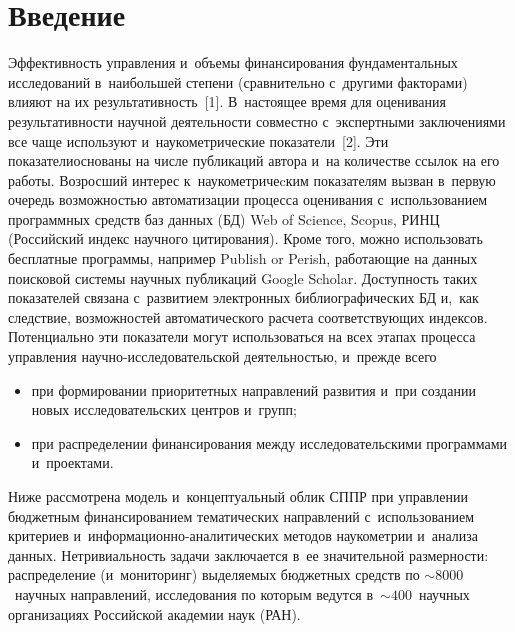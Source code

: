 \thispagestyle{headings}

\begin{multicols}{2}

\label{st\stat}
    
    \section{Введение}
    
    Эффективность управления и~объемы фи\-нансирования фундаментальных 
исследований в~наиболь\-шей степени (сравнительно с~другими факторами) 
влияют на их результативность~[1]. В~настоящее время для оценивания 
результативности научной деятельности совместно с~экс\-пертными 
заключениями все чаще используют и~наукометрические показатели~[2]. Эти 
показатели\linebreak основаны на числе публикаций автора и~на количестве ссылок на 
его работы. Возросший интерес\linebreak
 к~наукометричеcким показателям вызван 
в~первую очередь возможностью автоматизации процесса оценивания 
с~использованием программных средств баз данных (БД)  Web of Science, Scopus, 
РИНЦ (Российский индекс научного цитирования). 
Кроме того, можно использовать бесплатные программы, например 
Publish or Perish, ра\-бо\-тающие на данных поисковой системы научных\linebreak 
пуб\-ли\-ка\-ций Google Scholar. Доступность таких показателей связана 
с~развитием электронных биб\-лио\-гра\-фи\-че\-ских БД и,~как следствие, 
возможностей автоматического расчета соответствующих индексов. 
Потенциально эти показатели могут использоваться на всех этапах процесса 
управления на\-уч\-но-ис\-сле\-до\-ва\-тель\-ской деятельностью, и~преж\-де 
всего

\columnbreak

\noindent
\begin{itemize}
\item при формировании приоритетных направлений развития и~при 
создании новых исследовательских центров и~групп;\\[-14pt] 
\item при распределении 
финансирования между исследовательскими программами и~проектами.
\end{itemize}

 Ниже 
рассмотрена модель и~концептуальный облик СППР 
при управ\-ле\-нии бюджетным финансированием тематических 
направлений с~использованием критериев  
и~ин\-фор\-ма\-ци\-он\-но-ана\-ли\-ти\-че\-ских методов наукометрии и~анализа 
данных.\linebreak
 Нетривиальность задачи заключается в~ее значительной размерности: 
распределение (и~мониторинг) выделяемых бюджетных средств по 
$\sim8000$~научных направлений, исследования по которым ведут\-ся в~$\sim 
400$~научных организациях Российской академии наук (РАН). 


\end{multicols}
